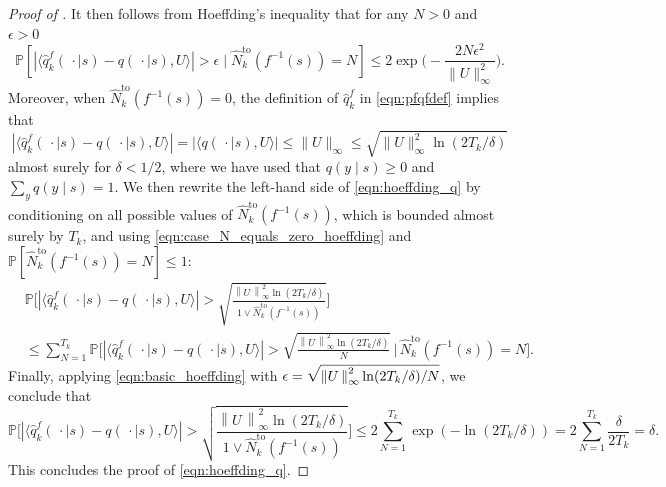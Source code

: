 \documentclass[11pt]{article}
\newcommand{\mbbP}{\mathbb{P}}
\newcommand{\norm}[1]{\left\lVert#1\,\right\rVert}
\newcommand{\bkt}[1]{\left[#1\right]}
\theoremstyle{definition}
\theoremstyle{definition}
\begin{document}
\begin{proof}[Proof of ]
	It then follows from Hoeffding's inequality that for any $N>0$ and $\epsilon>0$
	\begin{equation}
		\label{eqn:basic_hoeffding}
		\mbbP\bkt{
		|\langle \hat{q}^f_k(\,\cdot \mid s)-q(\,\cdot \mid s), U\rangle| > \epsilon
		\mid
		\hat{N}^{\mathrm{to}}_k(f^{-1}(s))=N
		}
		\leq
		2\exp\biggl(
		-
		\frac{2N\epsilon^2}{\lVert U\rVert_{\infty}^2}
		\biggr)
		.
	\end{equation}
	Moreover, when $\hat{N}^{\mathrm{to}}_k(f^{-1}(s))=0$, the definition of $\hat{q}_k^f$ in \eqref{eqn:pfqfdef} implies that
	\begin{equation}
		\label{eqn:case_N_equals_zero_hoeffding}
		|\langle \hat{q}_k^f(\,\cdot \mid s) - q(\,\cdot \mid s), U\rangle |
		=
		|\langle q(\,\cdot \mid s), U\rangle|
		\leq
		\lVert U\rVert_{\infty}
		\leq
		\sqrt{\lVert U\rVert_{\infty}^2\ln(2T_k/\delta)}
	\end{equation}
	almost surely for $\delta<1/2$, where we have used that $q(y\mid s)\geq 0$ and $\sum_{y}q(y\mid s)=1$.
	We then rewrite the left-hand side of \eqref{eqn:hoeffding_q} by conditioning on all possible values of $\hat{N}^{\mathrm{to}}_k(f^{-1}(s))$, which is bounded almost surely by $T_k$, and using \eqref{eqn:case_N_equals_zero_hoeffding} and $\mbbP[\hat{N}^{\mathrm{to}}_k(f^{-1}(s))=N]\leq 1$:
	\begin{equation}
		\label{eqn:sum_over_all_values_of_N}
		\begin{split}
			 &
			\mbbP\biggl[
			|\langle \hat{q}^f_k(\,\cdot \mid s)-q(\,\cdot \mid s), U\rangle |>\sqrt{\frac{\norm{U}_{\infty}^2\ln(2T_k/\delta)}{1\vee\hat{N}^{\mathrm{to}}_k(f^{-1}(s))}}
			\biggr]
			\\
			 &
			\leq
			\sum_{N=1}^{T_k}
			\mbbP\biggl[
			|\langle \hat{q}^f_k(\,\cdot \mid s)-q(\,\cdot \mid s), U\rangle|>\sqrt{\frac{\norm{U}_{\infty}^2\ln(2T_k/\delta)}{N}}
			\,\bigg|\,
			\hat{N}^{\mathrm{to}}_k(f^{-1}(s)) = N
			\biggr]
			.
		\end{split}
	\end{equation}
	Finally, applying \eqref{eqn:basic_hoeffding} with $\epsilon = \sqrt{\smash[b]{\norm{U}_{\infty}^2\ln(2T_k/\delta)/N}}$, we conclude that
	\begin{equation}
		\mbbP\biggl[
		|\langle \hat{q}^f_k(\,\cdot \mid s)-q(\,\cdot \mid s), U\rangle |>\sqrt{\frac{\norm{U}_{\infty}^2\ln(2T_k/\delta)}{1\vee\hat{N}^{\mathrm{to}}_k(f^{-1}(s))}}
		\biggr]
		\leq
		2\sum_{N=1}^{T_k}
		\exp(
		-
		\ln(2T_k/\delta)
		)
		=
		2\sum_{N=1}^{T_k}\frac{\delta}{2T_k}
		=
		\delta.
	\end{equation}
	This concludes the proof of \eqref{eqn:hoeffding_q}.


\end{proof}
\end{document}
